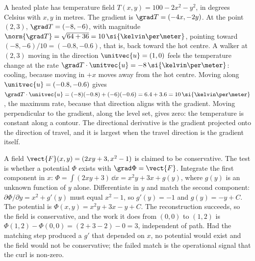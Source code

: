 \begin{example}
A heated plate has temperature field $T(x, y) = 100 - 2x^{2} - y^{2}$,
in degrees Celsius with $x, y$ in metres. The gradient is
$\grad T = (-4x, -2y)$. At the point $(2, 3)$, $\grad T = (-8, -6)$,
with magnitude $\norm{\grad T} = \sqrt{64 + 36} = 10\,\si{\kelvin\per
\meter}$, pointing toward $(-8, -6)/10 = (-0.8, -0.6)$, that is, back
toward the hot centre. A walker at $(2, 3)$ moving in the direction
$\unitvec{u} = (1, 0)$ feels the temperature change at the rate
$\grad T\cdot\unitvec{u} = -8\,\si{\kelvin\per\meter}$: cooling,
because moving in $+x$ moves away from the hot centre. Moving along
$\unitvec{u} = (-0.8, -0.6)$ gives $\grad T\cdot\unitvec{u} =
(-8)(-0.8) + (-6)(-0.6) = 6.4 + 3.6 = 10\,\si{\kelvin\per\meter}$,
the maximum rate, because that direction aligns with the gradient.
Moving perpendicular to the gradient, along the level set, gives
zero: the temperature is constant along a contour. The directional
derivative is the gradient projected onto the direction of travel,
and it is largest when the travel direction is the gradient itself.
\end{example}

\begin{example}
A field $\vect{F}(x, y) = (2xy + 3, x^{2} - 1)$ is claimed to be
conservative. The test is whether a potential $\Phi$ exists with
$\grad\Phi = \vect{F}$. Integrate the first component in $x$:
$\Phi = \int(2xy + 3)\,\dd x = x^{2}y + 3x + g(y)$, where $g(y)$ is an
unknown function of $y$ alone. Differentiate in $y$ and match the
second component: $\partial\Phi/\partial y = x^{2} + g'(y)$ must
equal $x^{2} - 1$, so $g'(y) = -1$ and $g(y) = -y + C$. The potential
is $\Phi(x, y) = x^{2}y + 3x - y + C$. The reconstruction succeeds, so
the field is conservative, and the work it does from $(0, 0)$ to
$(1, 2)$ is $\Phi(1, 2) - \Phi(0, 0) = (2 + 3 - 2) - 0 = 3$,
independent of path. Had the matching step produced a $g'$ that
depended on $x$, no potential would exist and the field would not be
conservative; the failed match is the operational signal that the
curl is non-zero.
\end{example}

